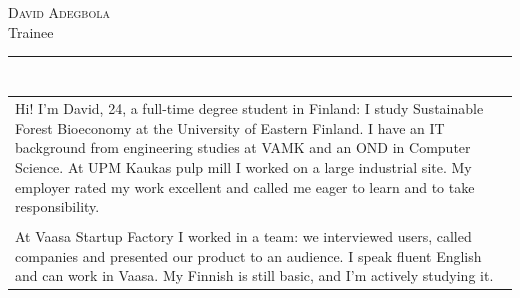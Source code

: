\documentclass[a4paper,11pt]{article}
\begin{document}
\small
\setlength{\cvlabelw}{3.9cm}
\titlespacing{\section}{0pt}{0.55em}{2pt}

\begin{cvheader}
\par{\centering
		{\Huge \textsc{David Adegbola}}\\[0.4em]
		{\Large Trainee}
	\bigskip\par}

\hrule
\vspace{0.5em}
\end{cvheader}

\section{}
\begin{tabular}{p{}}
 Hi! I'm David, 24, a full-time degree student in Finland: I study Sustainable Forest Bioeconomy at the University of Eastern Finland. I have an IT background from engineering studies at VAMK and an OND in Computer Science. At UPM Kaukas pulp mill I worked on a large industrial site. My employer rated my work excellent and called me eager to learn and to take responsibility.\\\\

 At Vaasa Startup Factory I worked in a team: we interviewed users, called companies and presented our product to an audience. I speak fluent English and can work in Vaasa. My Finnish is still basic, and I'm actively studying it.
\end{tabular}

\section{}
\end{document}
